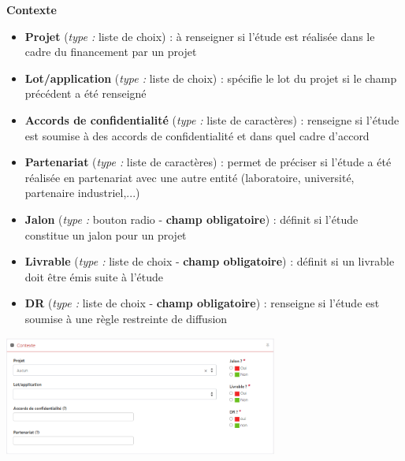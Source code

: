 \vspace{0.5cm}

\begin{minipage}[c]{0.45\linewidth}
\textbf{Contexte}
\begin{itemize}[label=$\Rightarrow$, font=\LARGE]
   \item \textbf{Projet} (\textit{type :} liste de choix) : à renseigner si l'étude est réalisée dans le cadre du financement par un projet
   \item \textbf{Lot/application} (\textit{type :} liste de choix) : spécifie le lot du projet si le champ précédent a été renseigné
   \item \textbf{Accords de confidentialité} (\textit{type :} liste de caractères) : renseigne si l'étude est soumise à des accords de confidentialité et dans quel cadre d'accord
   \item \textbf{Partenariat} (\textit{type :} liste de caractères) : permet de préciser si l'étude a été réalisée en partenariat avec une autre entité (laboratoire, université, partenaire industriel,...)
   \item \textbf{Jalon} (\textit{type :} bouton radio - \textbf{champ obligatoire}) : définit si l'étude constitue un jalon pour un projet
   \item \textbf{Livrable} (\textit{type :} liste de choix - \textbf{champ obligatoire}) : définit si un livrable doit être émis suite à l'étude
   \item \textbf{DR} (\textit{type :} liste de choix - \textbf{champ obligatoire}) : renseigne si l'étude est soumise à une règle restreinte de diffusion
\end{itemize}

\end{minipage} \hfill
\begin{minipage}[c]{0.5\linewidth}
   \includegraphics[width=9cm]{pictures/GEA-contexte.png}\vspace*{0.2cm}

\end{minipage}

